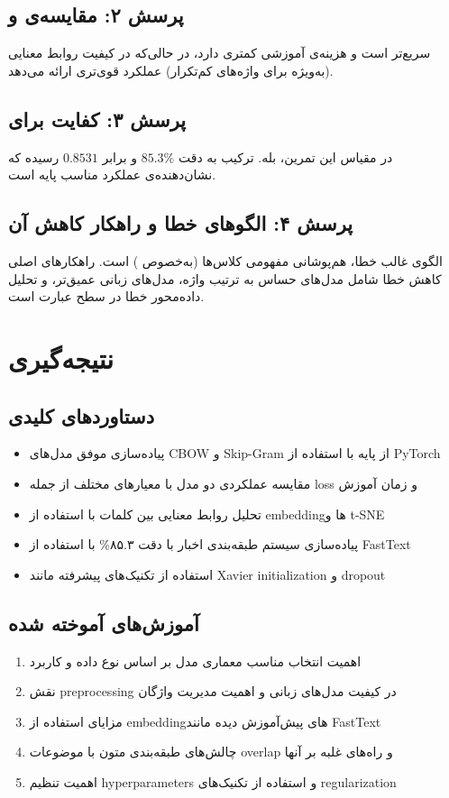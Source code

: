 \documentclass[12pt,a4paper]{article}
\begin{document}
\subsection{پرسش ۲: مقایسه‌ی  و }
 سریع‌تر است و هزینه‌ی آموزشی کمتری دارد، در حالی‌که  در کیفیت روابط معنایی (به‌ویژه برای واژه‌های کم‌تکرار) عملکرد قوی‌تری ارائه می‌دهد.

\subsection{پرسش ۳: کفایت  برای }
در مقیاس این تمرین، بله. ترکیب  به دقت \(85.3\%\) و  برابر \(0.8531\) رسیده که نشان‌دهنده‌ی عملکرد مناسب پایه است.

\subsection{پرسش ۴: الگوهای خطا و راهکار کاهش آن}
الگوی غالب خطا، هم‌پوشانی مفهومی کلاس‌ها (به‌خصوص ) است. راهکارهای اصلی کاهش خطا شامل مدل‌های حساس به ترتیب واژه،  مدل‌های زبانی عمیق‌تر، و تحلیل داده‌محور خطا در سطح عبارت است.

\section{نتیجه‌گیری}

\subsection{دستاوردهای کلیدی}
\begin{itemize}
\item پیاده‌سازی موفق مدل‌های CBOW و Skip-Gram از پایه با استفاده از PyTorch
\item مقایسه عملکردی دو مدل با معیارهای مختلف از جمله loss و زمان آموزش
\item تحلیل روابط معنایی بین کلمات با استفاده از embeddingها و t-SNE
\item پیاده‌سازی سیستم طبقه‌بندی اخبار با دقت ۸۵.۳\% با استفاده از FastText
\item استفاده از تکنیک‌های پیشرفته مانند Xavier initialization و dropout
\end{itemize}

\subsection{آموزش‌های آموخته شده}
\begin{enumerate}
\item اهمیت انتخاب مناسب معماری مدل بر اساس نوع داده و کاربرد
\item نقش preprocessing در کیفیت مدل‌های زبانی و اهمیت مدیریت واژگان
\item مزایای استفاده از embeddingهای پیش‌آموزش دیده مانند FastText
\item چالش‌های طبقه‌بندی متون با موضوعات overlap و راه‌های غلبه بر آنها
\item اهمیت تنظیم hyperparameters و استفاده از تکنیک‌های regularization
\end{enumerate}
\end{document}
